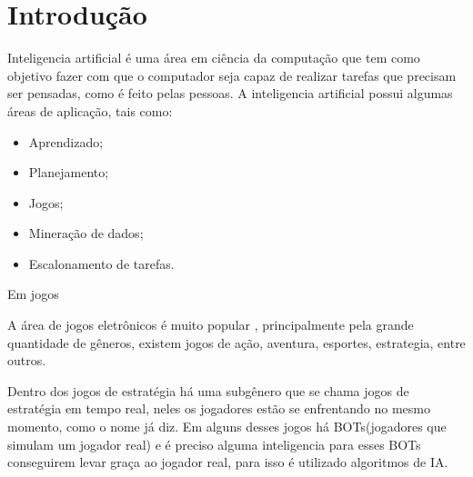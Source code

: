 \chapter{\label{chap:intro}Introdução}



Inteligencia artificial é uma área em ciência da computação que tem como objetivo fazer com que o computador seja capaz de realizar tarefas que precisam ser pensadas, como é feito pelas pessoas.  
A inteligencia artificial possui algumas áreas de aplicação, tais como: %
\begin{itemize}
	\item Aprendizado;
	\item Planejamento;
	\item Jogos;
	\item Mineração de dados;
	\item Escalonamento de tarefas.
\end{itemize}


Em jogos

A área de jogos eletrônicos é muito popular %
, principalmente pela grande quantidade de gêneros, existem jogos de ação, aventura, esportes, estrategia, entre outros. 


Dentro dos jogos de estratégia há uma subgênero que se chama jogos de estratégia em tempo real, neles os jogadores estão se enfrentando no mesmo momento, como o nome já diz. 
Em alguns desses jogos há BOTs(jogadores que simulam um jogador real) e é preciso alguma inteligencia para esses BOTs conseguirem levar graça ao jogador real, para isso é utilizado algoritmos de IA. 

